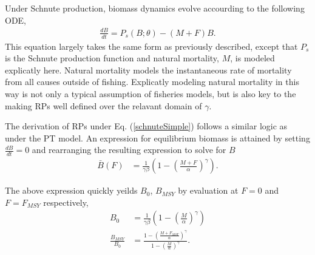 \documentclass[12pt]{article}
\begin{document}
%
Under Schnute production, biomass dynamics evolve accourding to the following ODE, 
%
\begin{align}
\frac{dB}{dt} = P_s(B;\theta) - (M+F)B. \label{schnuteSimple}
\end{align}
%
This equation largely takes the same form as previously described, except that 
$P_s$ is the Schnute production function and natural mortality, $M$, is modeled 
explicatly here. %
Natural mortality models the instantaneous rate of mortality from all causes 
outside of fishing. Explicatly modeling natural mortality in this way is not 
only a typical assumption of fisheries models, but is also key to the making 
RPs well defined over the relavant domain of $\gamma$.



%
The derivation of RPs under Eq. (\ref{schnuteSimple}) follows a similar logic 
as under the PT model. An expression for equilibrium biomass is attained by 
setting $\frac{dB}{dt}=0$ and rearranging the resulting expression to solve 
for $B$ 
%
\begin{align}
\bar{B}(F) &= \frac{1}{\gamma \beta}\left(1-\left(\frac{M+F}{\alpha}\right)^\gamma\right).
\label{BsEq}
\end{align}

%
The above expression quickly yeilds $B_0$, $B_{MSY}$ by evaluation at $F=0$ and $F=F_{MSY}$ respectively,
\begin{align}
B_0 &= \frac{1}{\gamma \beta}\left(1-\left(\frac{M}{\alpha}\right)^\gamma\right) \label{B0S}\\
\frac{B_{MSY}}{B_0} &= \frac{1-\left(\frac{M+F_{MSY}}{\alpha}\right)^\gamma}{ 1-\left(\frac{M}{\alpha}\right)^\gamma }. \label{BratS}
\end{align}
\end{document}
